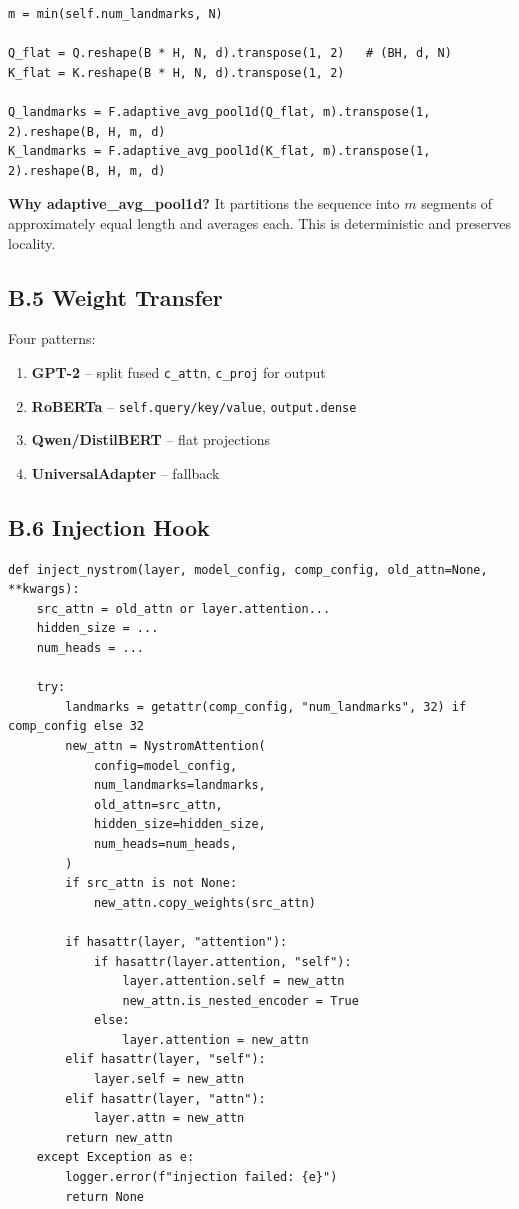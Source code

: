\begin{lstlisting}
m = min(self.num_landmarks, N)

Q_flat = Q.reshape(B * H, N, d).transpose(1, 2)   # (BH, d, N)
K_flat = K.reshape(B * H, N, d).transpose(1, 2)

Q_landmarks = F.adaptive_avg_pool1d(Q_flat, m).transpose(1, 2).reshape(B, H, m, d)
K_landmarks = F.adaptive_avg_pool1d(K_flat, m).transpose(1, 2).reshape(B, H, m, d)
\end{lstlisting}

\textbf{Why adaptive\_avg\_pool1d?} It partitions the sequence into $m$ segments 
of approximately equal length and averages each. This is deterministic and 
preserves locality.

\subsection{B.5 Weight Transfer}

Four patterns:

\begin{enumerate}
\item \textbf{GPT-2} -- split fused \texttt{c\_attn}, \texttt{c\_proj} for output
\item \textbf{RoBERTa} -- \texttt{self.query/key/value}, \texttt{output.dense}
\item \textbf{Qwen/DistilBERT} -- flat projections
\item \textbf{UniversalAdapter} -- fallback

\end{enumerate}
\subsection{B.6 Injection Hook}

\begin{lstlisting}
def inject_nystrom(layer, model_config, comp_config, old_attn=None, **kwargs):
    src_attn = old_attn or layer.attention...
    hidden_size = ...
    num_heads = ...
    
    try:
        landmarks = getattr(comp_config, "num_landmarks", 32) if comp_config else 32
        new_attn = NystromAttention(
            config=model_config,
            num_landmarks=landmarks,
            old_attn=src_attn,
            hidden_size=hidden_size,
            num_heads=num_heads,
        )
        if src_attn is not None:
            new_attn.copy_weights(src_attn)
        
        if hasattr(layer, "attention"):
            if hasattr(layer.attention, "self"):
                layer.attention.self = new_attn
                new_attn.is_nested_encoder = True
            else:
                layer.attention = new_attn
        elif hasattr(layer, "self"):
            layer.self = new_attn
        elif hasattr(layer, "attn"):
            layer.attn = new_attn
        return new_attn
    except Exception as e:
        logger.error(f"injection failed: {e}")
        return None
\end{lstlisting}

